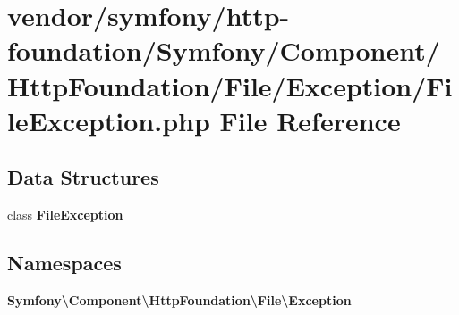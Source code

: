 \section{vendor/symfony/http-\/foundation/\+Symfony/\+Component/\+Http\+Foundation/\+File/\+Exception/\+File\+Exception.php File Reference}
\label{_file_exception_8php}
\subsection*{Data Structures}
\begin{DoxyCompactItemize}
\item 
class {\bf File\+Exception}
\end{DoxyCompactItemize}
\subsection*{Namespaces}
\begin{DoxyCompactItemize}
\item 
 {\bf Symfony\textbackslash{}\+Component\textbackslash{}\+Http\+Foundation\textbackslash{}\+File\textbackslash{}\+Exception}
\end{DoxyCompactItemize}
